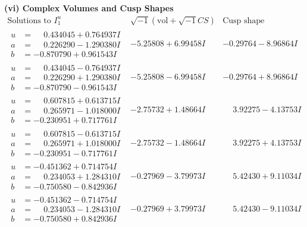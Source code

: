 \documentclass[1p]{elsarticle_modified}
\theoremstyle{definition}
\newcommand{\I}{\sqrt{-1}}
\begin{document}
\newpage\flushleft \textbf{(vi) Complex Volumes and Cusp Shapes}
$$\begin{array}{c|c|c}  
\text{Solutions to }I^u_{1}& \I (\text{vol} + \sqrt{-1}CS) & \text{Cusp shape}\\
 \hline 
\begin{aligned}
u &= \phantom{-}0.434045 + 0.764937 I \\
a &= \phantom{-}0.226290 - 1.290380 I \\
b &= -0.870790 + 0.961543 I\end{aligned}
 & -5.25808 + 6.99458 I & -0.29764 - 8.96864 I \\ \hline\begin{aligned}
u &= \phantom{-}0.434045 - 0.764937 I \\
a &= \phantom{-}0.226290 + 1.290380 I \\
b &= -0.870790 - 0.961543 I\end{aligned}
 & -5.25808 - 6.99458 I & -0.29764 + 8.96864 I \\ \hline\begin{aligned}
u &= \phantom{-}0.607815 + 0.613715 I \\
a &= \phantom{-}0.265971 - 1.018000 I \\
b &= -0.230951 + 0.717761 I\end{aligned}
 & -2.75732 + 1.48664 I & \phantom{-}3.92275 - 4.13753 I \\ \hline\begin{aligned}
u &= \phantom{-}0.607815 - 0.613715 I \\
a &= \phantom{-}0.265971 + 1.018000 I \\
b &= -0.230951 - 0.717761 I\end{aligned}
 & -2.75732 - 1.48664 I & \phantom{-}3.92275 + 4.13753 I \\ \hline\begin{aligned}
u &= -0.451362 + 0.714754 I \\
a &= \phantom{-}0.234053 + 1.284310 I \\
b &= -0.750580 - 0.842936 I\end{aligned}
 & -0.27969 - 3.79973 I & \phantom{-}5.42430 + 9.11034 I \\ \hline\begin{aligned}
u &= -0.451362 - 0.714754 I \\
a &= \phantom{-}0.234053 - 1.284310 I \\
b &= -0.750580 + 0.842936 I\end{aligned}
 & -0.27969 + 3.79973 I & \phantom{-}5.42430 - 9.11034 I \\ \hline\begin{aligned}

\end{aligned}
\end{array}$$
\end{document}

